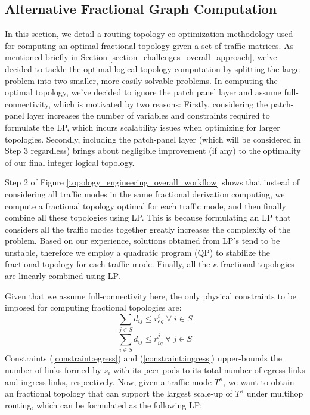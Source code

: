 \documentclass[sigconf]{acmart}
\theoremstyle{definition}
\begin{document}
\begin{appendices}
\subsection{Alternative Fractional Graph Computation}
In this section, we detail a routing-topology co-optimization methodology used for computing an optimal fractional topology given a set of traffic matrices. As mentioned briefly in Section \ref{section_challenges_overall_approach}, we've decided to tackle the optimal logical topology computation by splitting the large problem into two smaller, more easily-solvable problems. In computing the optimal topology, we've decided to ignore the patch panel layer and assume full-connectivity, which is motivated by two reasons: Firstly, considering the patch-panel layer increases the number of variables and constraints required to formulate the LP, which incurs scalability issues when optimizing for larger topologies. Secondly, including the patch-panel layer (which will be considered in Step 3 regardless) brings about negligible improvement (if any) to the optimality of our final integer logical topology. 

Step 2 of Figure \ref{topology_engineering_overall_workflow} shows that instead of considering all traffic modes in the same fractional derivation computing, we compute a fractional topology optimal for each traffic mode, and then finally combine all these topologies using LP. This is because formulating an LP that considers all the traffic modes together greatly increases the complexity of the problem. Based on our experience, solutions obtained from LP's tend to be unstable, therefore we employ a quadratic program (QP) to stabilize the fractional topology for each traffic mode. Finally, all the $\kappa$ fractional topologies are linearly combined using LP.

Given that we assume full-connectivity here, the only physical constraints to be imposed for computing fractional topologies are:
\begin{equation}
\sum\limits_{j \in S} d_{ij} \leq r_{eg}^i \; \forall \; i \in S 
\label{constraint:egress}
\end{equation}
\begin{equation}
\sum\limits_{i \in S} d_{ij} \leq r_{ig}^{ j} \; \forall \; j \in S
\label{constraint:ingress}
\end{equation}
Constraints (\ref{constraint:egress}) and (\ref{constraint:ingress}) upper-bounds the number of links formed by $s_i$ with its peer pods to its total number of egress links and ingress links, respectively. Now, given a traffic mode $T^\kappa$, we want to obtain an fractional topology that can support the largest scale-up of $T^\kappa$ under multihop routing, which can be formulated as the following LP:


\end{appendices}
\end{document}
